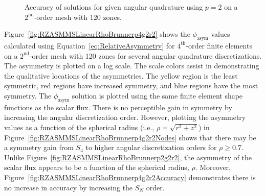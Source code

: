 \documentclass[12pt,letterpaper]{article}
\begin{document}
\begin{figure}[!htb]
\centering
{}
\caption{Accuracy of solutions for given angular quadrature using $p=2$ on a $2^\text{nd}$-order mesh with 120 zones.}
\label{fig:RZASMMSLinearRhoBrunnerp2g2r2Accuracy}
\end{figure}

\FloatBarrier

Figure~\ref{fig:RZASMMSLinearRhoBrunnerp4g2r2} shows the $\phi_\text{asym}$ values calculated using Equation~\ref{eq:RelativeAsymmetry} for $4^\text{th}$-order finite elements on a $2^\text{nd}$-order mesh with 120 zones for several angular quadrature discretizations. The asymmetry is plotted on a log scale. The scale colors assist in demonstrating the qualitative locations of the asymmetries. The yellow region is the least symmetric, red regions have increased symmetry, and blue regions have the most symmetry. The $\phi_\text{asym}$ solution is plotted using the same finite element shape functions as the scalar flux. There is no perceptible gain in symmetry by increasing the angular discretization order. However, plotting the asymmetry values as a function of the spherical radius (i.e., $\rho=\sqrt{r^2+z^2}$) in Figure~\ref{fig:RZASMMSLinearRhoBrunnerp4g2r2Nodes} shows that there may be a symmetry gain from $S_4$ to higher angular discretization orders for $\rho \geq 0.7$. Unlike Figure~\ref{fig:RZASMMSLinearRhoBrunnerp2g2r2}, the asymmetry of the scalar flux appears to be a function of the spherical radius, $\rho$. Moreover, Figure~\ref{fig:RZASMMSLinearRhoBrunnerp4g2r2Accuracy} demonstrates there is no increase in accuracy by increasing the $S_N$ order.
\end{document}
